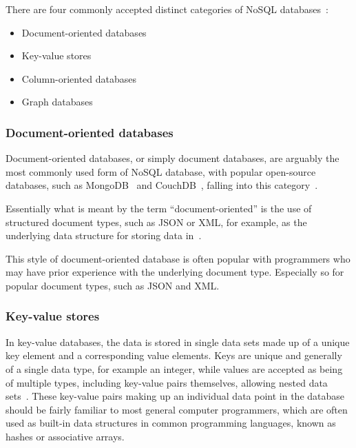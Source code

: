 \documentclass{article}
\begin{document}
There are four commonly accepted distinct categories of NoSQL databases~\cite{tauro2012comparative}:

\begin{itemize}
    \item Document-oriented databases
    \item Key-value stores
    \item Column-oriented databases
    \item Graph databases
\end{itemize}

\subsubsection{Document-oriented databases} %
\label{ssub:document_oriented}

Document-oriented databases, or simply document databases, are arguably the most commonly used form of NoSQL
database, with popular open-source databases, such as MongoDB~\cite{6_mongodb.org_2015} and 
CouchDB~\cite{5_couchdb.apache.org_2015}, falling into this category~\cite{tauro2012comparative}.

Essentially what is meant by the term ``document-oriented'' is the use of structured document types, such
as JSON or XML, for example, as the underlying data structure for storing data in~\cite{han2011survey}.

This style of document-oriented database is often popular with programmers who may have prior experience
with the underlying document type. Especially so for popular document types, such as JSON and XML.



\subsubsection{Key-value stores}
\label{ssub:kvs}

In key-value databases, the data is stored in single data sets made up of a unique key element and a corresponding
value elements. Keys are unique and generally of a single data type, for example an integer, while values 
are accepted as being of multiple types, including key-value pairs themselves, allowing nested data
sets~\cite{weber2010nosql}. These key-value pairs making up an individual data point in the database
should be fairly familiar to most general computer programmers, which are often used as built-in
data structures in common programming languages, known as hashes or associative arrays.
\end{document}
